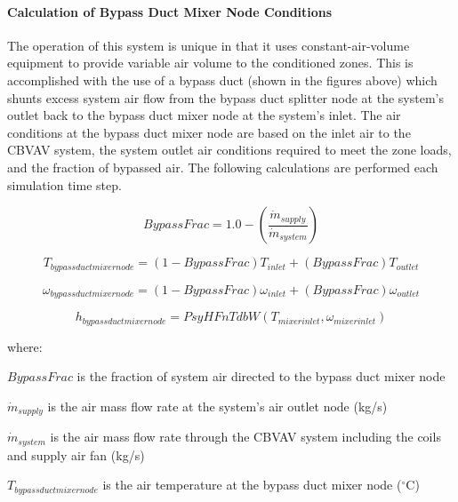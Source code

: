 \paragraph{Calculation of Bypass Duct Mixer Node Conditions}\label{calculation-of-bypass-duct-mixer-node-conditions}

The operation of this system is unique in that it uses constant-air-volume equipment to provide variable air volume to the conditioned zones. This is accomplished with the use of a bypass duct (shown in the figures above) which shunts excess system air flow from the bypass duct splitter node at the system's outlet back to the bypass duct mixer node at the system's inlet. The air conditions at the bypass duct mixer node are based on the inlet air to the CBVAV system, the system outlet air conditions required to meet the zone loads, and the fraction of bypassed air. The following calculations are performed each simulation time step.

\begin{equation}
BypassFrac = 1.0 - \left( {\frac{{{{\dot m}_{supply}}}}{{{{\dot m}_{system}}}}} \right)
\end{equation}

\begin{equation}
{T_{bypassductmixernode}} = \left( {1 - BypassFrac} \right){T_{inlet}} + \left( {BypassFrac} \right){T_{outlet}}
\end{equation}

\begin{equation}
{\omega_{bypassductmixernode}} = \left( {1 - BypassFrac} \right){\omega_{inlet}} + \left( {BypassFrac} \right){\omega_{outlet}}
\end{equation}

\begin{equation}
{h_{bypassductmixernode}} = PsyHFnTdbW\left( {{T_{mixerinlet}},{\omega_{mixerinlet}}} \right)
\end{equation}

where:

\(BypassFrac\) is the fraction of system air directed to the bypass duct mixer node

\({\dot m_{supply}}\) is the air mass flow rate at the system's air outlet node (kg/s)

\({\dot m_{system}}\) is the air mass flow rate through the CBVAV system including the coils and supply air fan (kg/s)

\({T_{bypassductmixernode}}\) is the air temperature at the bypass duct mixer node (\(^{\circ}\)C)

